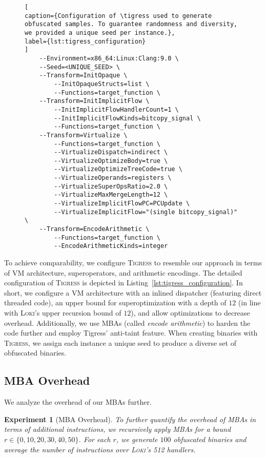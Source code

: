 \documentclass[letterpaper,twocolumn,10pt]{article}
\theoremstyle{customexample}
\theoremstyle{customexperiment}
\newtheorem{experiment}{Experiment}
\newcommand{\loki}{\textsc{Loki}\xspace}
\newcommand{\tigress}{\textsc{Tigress}\xspace}
\begin{document}
\begin{figure}[htb]
\begin{lstlisting}[
caption={Configuration of \tigress used to generate obfuscated samples. To guarantee randomness and diversity, we provided a unique seed per instance.},
label={lst:tigress_configuration}
]
    --Environment=x86_64:Linux:Clang:9.0 \
    --Seed=<UNIQUE_SEED> \
    --Transform=InitOpaque \
        --InitOpaqueStructs=list \
        --Functions=target_function \
    --Transform=InitImplicitFlow \
        --InitImplicitFlowHandlerCount=1 \
        --InitImplicitFlowKinds=bitcopy_signal \
        --Functions=target_function \
    --Transform=Virtualize \
        --Functions=target_function \
        --VirtualizeDispatch=indirect \
        --VirtualizeOptimizeBody=true \
        --VirtualizeOptimizeTreeCode=true \
        --VirtualizeOperands=registers \
        --VirtualizeSuperOpsRatio=2.0 \
        --VirtualizeMaxMergeLength=12 \
        --VirtualizeImplicitFlowPC=PCUpdate \
        --VirtualizeImplicitFlow="(single bitcopy_signal)" \
    --Transform=EncodeArithmetic \
        --Functions=target_function \
        --EncodeArithmeticKinds=integer
\end{lstlisting}
\end{figure}

To achieve comparability, we configure \tigress to resemble our approach in terms of VM architecture, superoperators, and arithmetic encodings. The detailed configuration of \tigress is depicted in Listing~\ref{lst:tigress_configuration}. In short, we configure a VM architecture with an inlined dispatcher (featuring direct threaded code), an upper bound for superoptimization with a depth of $12$ (in line with \loki's upper recursion bound of $12$), and allow optimizations to decrease overhead. Additionally, we use MBAs (called \emph{encode arithmetic}) to harden the code further and employ Tigress' anti-taint feature. When creating binaries with \tigress, we assign each instance a unique seed to produce a diverse set of obfuscated binaries.



\subsection{MBA Overhead}\label{sec:appendix:mba_overhead}
We analyze the overhead of our MBAs further.

\begin{experiment}[MBA Overhead]\label{experiment:benchmarking:mba_bounds}
To further quantify the overhead of MBAs in terms of additional instructions, we recursively apply MBAs for a bound $r \in\{0, 10, 20, 30, 40, 50\}$. For each $r$, we generate $100$ obfuscated binaries and average the number of instructions over \loki's 512 handlers.
\end{experiment}
\end{document}
